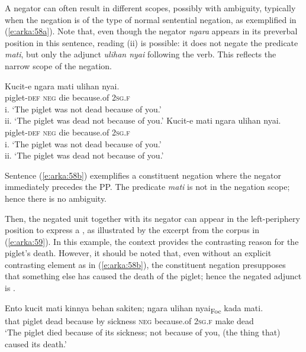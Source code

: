 \documentclass[output=paper
,modfonts
,nonflat]{langsci/langscibook}
\begin{document}
A negator can often result in different scopes, possibly with ambiguity, typically when the negation is of the type of normal sentential negation, as exemplified in (\ref{e:arka:58a}). Note that, even though the negator \textit{ngara} appears in its preverbal position in this sentence, reading (ii) is possible: it does not negate the predicate \textit{mati}, but only the adjunct \textit{ulihan nyai} following the verb. This reflects the narrow scope of the negation.

\begin{exe}
	\ex\label{e:arka:58}
	\begin{xlist}
		\ex\label{e:arka:58a}
		\gll Kucit-e    ngara   mati   ulihan   nyai.\\
		piglet-\textsc{def}  \textsc{neg}  die  because.of  2\textsc{sg.f}\\
		\glt i.   ‘The piglet was not dead because of you.’\\
		\glt ii.   ‘The piglet was dead not because of you.’    
		\ex\label{e:arka:58b}
		\gll Kucit-e    mati   ngara   ulihan   nyai.\\
		piglet-\textsc{def}  \textsc{neg}  die  because.of  2\textsc{sg.f}\\
		\glt * i.   ‘The piglet was not dead because of you.’\\
		\glt ii.   ‘The piglet was dead not because of you.’ 
	\end{xlist}
\end{exe}

\noindent
Sentence (\ref{e:arka:58b}) exemplifies a constituent negation where the negator immediately precedes the PP. The predicate \textit{mati} is not in the negation scope; hence there is no ambiguity.  

\largerpage 
Then, the negated unit together with its negator can appear in the left-periphery position to express a , as illustrated by the excerpt from the corpus in (\ref{e:arka:59}). In this example, the context provides the contrasting reason for the piglet's death. However, it should be noted that, even without an explicit contrasting element as in (\ref{e:arka:58b}), the constituent negation presupposes that something else has caused the death of the piglet; hence the negated adjunct is .

\begin{exe}
	\ex\label{e:arka:59}
	\gll Ento   kucit   mati   kinnya   behan   sakiten; {\ob}ngara   {\ob}ulihan   nyai{\cb}{\cb}\textsubscript{Foc}   kada   mati.\\
	that   piglet   dead  because   by  sickness \phantom{[}\textsc{neg}  \phantom{[}because.of  2\textsc{sg.f}  make  dead\\
	\glt ‘The piglet died because of its sickness; not because of you, (the thing that) caused its death.’
\end{exe}
\end{document}

